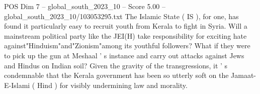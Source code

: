 \begin{textsample}{POS Dim 7 – global\_south\_2023\_10 – Score 5.00 – global\_south\_2023\_10/103053295.txt}
The Islamic State ( IS ), for one, has found it particularly easy to recruit youth from Kerala to fight in Syria.
Will a mainstream political party like the JEI(H) take responsibility for exciting hate against"Hinduism"and"Zionism"among its youthful followers?
What if they were to pick up the gun at Meshaal ' s instance and carry out attacks against Jews and Hindus on Indian soil?
Given the gravity of the transgressions, it ' s condemnable that the Kerala government has been so utterly soft on the Jamaat-E-Islami ( Hind ) for visibly undermining law and morality.

\end{textsample}
